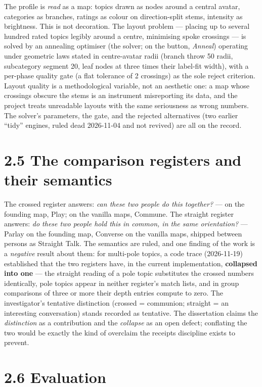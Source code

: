 The profile is \emph{read} as a map: topics drawn as nodes around a
central avatar, categories as branches, ratings as colour on
direction-split stems, intensity as brightness. This is not decoration.
The layout problem --- placing up to several hundred rated topics
legibly around a centre, minimising spoke crossings --- is solved by an
annealing optimiser (the solver; on the button, \emph{Anneal}) operating
under geometric laws stated in centre-avatar radii (branch throw 50
radii, subcategory segment 20, leaf nodes at three times their label-fit
width), with a per-phase quality gate (a flat tolerance of 2 crossings)
as the sole reject criterion. Layout quality is a methodological
variable, not an aesthetic one: a map whose crossings obscure the stems
is an instrument misreporting its data, and the project treats
unreadable layouts with the same seriousness as wrong numbers. The
solver's parameters, the gate, and the rejected alternatives (two
earlier ``tidy'' engines, ruled dead 2026-11-04 and not revived) are all
on the record.

\section{2.5 The comparison registers and their
semantics}\label{the-comparison-registers-and-their-semantics}

The crossed register answers: \emph{can these two people do this
together?} --- on the founding map, Play; on the vanilla maps, Commune.
The straight register answers: \emph{do these two people hold this in
common, in the same orientation?} --- Parlay on the founding map,
Converse on the vanilla maps, shipped between persons as Straight Talk.
The semantics are ruled, and one finding of the work is a
\emph{negative} result about them: for multi-pole topics, a code trace
(2026-11-19) established that the two registers have, in the current
implementation, \textbf{collapsed into one} --- the straight reading of
a pole topic substitutes the crossed numbers identically, pole topics
appear in neither register's match lists, and in group comparisons of
three or more their depth entries compute to zero. The investigator's
tentative distinction (crossed = communion; straight = an interesting
conversation) stands recorded as tentative. The dissertation claims the
\emph{distinction} as a contribution and the \emph{collapse} as an open
defect; conflating the two would be exactly the kind of overclaim the
receipts discipline exists to prevent.

\section{2.6 Evaluation}\label{evaluation}

